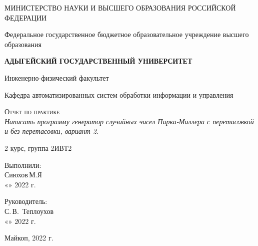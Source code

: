\documentclass[12pt,a4paper]{scrartcl}
\begin{document}
	\begin{titlepage}
		\begin{center}
			\large
			МИНИСТЕРСТВО НАУКИ И ВЫСШЕГО ОБРАЗОВАНИЯ РОССИЙСКОЙ ФЕДЕРАЦИИ
			
			Федеральное государственное бюджетное образовательное учреждение высшего образования
			
			\textbf{АДЫГЕЙСКИЙ ГОСУДАРСТВЕННЫЙ УНИВЕРСИТЕТ}
			\vspace{0.25cm}
			
			Инженерно-физический факультет
			
			Кафедра автоматизированных систем обработки информации и управления
			\vfill
                         \vfill 
                          
                         \textsc{Отчет по практике}\\[5mm] 
                          
                         {\LARGE \textit{Написать программу генератор случайных чисел Парка-Миллера с перетасовкой и без перетасовки, вариант 2.}} 
                         \bigskip 
                          
                         2 курс, группа 2ИВТ2 
                 \end{center} 
                 \vfill 
                  
                 \newlength{\ML} 
                 \hfill\begin{minipage}{0.5\textwidth} 
                         Выполнили:\\ 
                         
                         \underline{\hspace{\ML}} Сиюхов\,М.Я\\
                      
                         «\underline{\hspace{0.7cm}}» \underline{\hspace{2cm}} 2022 г. 
                 \end{minipage}%
                 \bigskip 
                  
                 \hfill\begin{minipage}{0.5\textwidth} 
                         Руководитель:\\ 
                         \underline{\hspace{\ML}} С.\,В.~Теплоухов\\ 
                         «\underline{\hspace{0.7cm}}» \underline{\hspace{2cm}} 2022 г. 
                 \end{minipage}%
                 \vfill 
 
                  
\begin{center} 
Майкоп, 2022 г. 
\end{center} 
\end{titlepage} 
\end{document}
